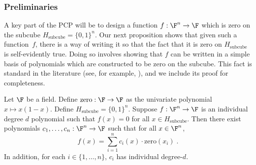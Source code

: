 \subsubsection{Preliminaries}

A key part of the PCP will be to design a function $f:\F^n \rightarrow \F$ which
is zero on the subcube $H_{\mathrm{subcube}} = \{0,1\}^n$.
Our next proposition shows that given such a function~$f$, there is a way of
writing it so that the fact that it is zero on $H_{\mathrm{subcube}}$ is
self-evidently true.
Doing so involves showing that $f$ can be written in a simple basis of
polynomials which are constructed to be zero on the subcube.
This fact is standard in the literature (see, for example,
\cite[Lemma~$4.11$]{ben2008short}), and we include its proof for
completeness.

\begin{proposition}\label{prop:zero-basis}
  Let $\F$ be a field.
  Define $\mathrm{zero}: \F \to \F$ as the univariate polynomial $x \mapsto
  x(1-x)$.
Define $H_{\mathrm{subcube}} = \{0,1\}^n$.
  Suppose $f:\F^n \rightarrow \F$ is an individual degree $d$ polynomial such
  that $f(x) = 0$ for all $x \in H_{\mathrm{subcube}}$.
  Then there exist polynomials $c_1, \ldots, c_n:\F^n \rightarrow \F$ such that
  for all $x \in \F^n$,
  \begin{equation*}
  f(x) = \sum_{i=1}^n c_i(x) \cdot \mathrm{zero}(x_i)\;.
  \end{equation*}
  In addition, for each $i \in \{1, \ldots, n\}$, $c_i$ has individual degree-$d$. 
\end{proposition}
  
